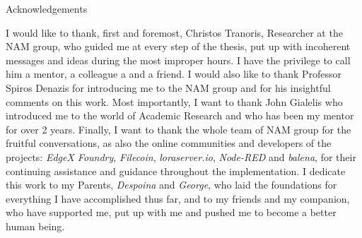 \begin{center}
{\LARGE Acknowledgements}\\[1cm]
\end{center}

I would like to thank, first and foremost, Christos Tranoris, Researcher at the NAM group, who guided me at every step of the thesis, put up with incoherent messages and ideas during the most improper hours. I have the privilege to call him a mentor, a colleague a and a friend. I would also like to thank Professor Spiros Denazis for introducing me to the NAM group and for his insightful comments on this work. Most importantly, I want to thank John Gialelis who introduced me to the  world of Academic Research and who has been my mentor for over 2 years. Finally, I want to thank the whole team of NAM group for the fruitful conversations, as also the online communities and developers of the projects: \textit{EdgeX Foundry}, \textit{Filecoin}, \textit{loraserver.io}, \textit{Node-RED} and \textit{balena}, for their continuing assistance and guidance throughout the implementation. I dedicate this work to my Parents, \textit{Despoina} and \textit{George}, who laid the foundations for everything I have accomplished thus far, and to my friends and my companion, who have supported me, put up with me and pushed me to become a better human being.
